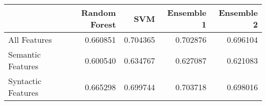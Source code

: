 \begin{tabular}{lrrrr}
\toprule
{} &  Random Forest &       SVM &  Ensemble 1 &  Ensemble 2 \\
\midrule
All Features       &       0.660851 &  0.704365 &    0.702876 &    0.696104 \\
Semantic Features  &       0.600540 &  0.634767 &    0.627087 &    0.621083 \\
Syntactic Features &       0.665298 &  0.699744 &    0.703718 &    0.698016 \\
\bottomrule
\end{tabular}
